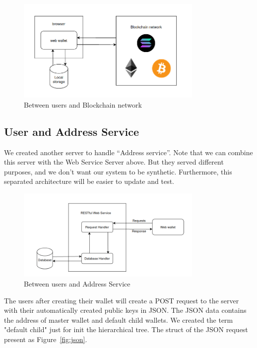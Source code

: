 \begin{figure}[ht!]
    \centering
    \includegraphics[width=0.8\textwidth]{images/design_ubl.png}
    \caption[Between users and Blockchain network]{Between users and Blockchain network}
    \label{fig:ubl}
\end{figure}

\subsection{User and Address Service}

We created another server to handle “Address service”. Note that we can combine this server with the Web Service Server above. But they served different purposes, and we don’t want our system to be synthetic. Furthermore, this separated architecture will be easier to update and test.

\begin{figure}[ht!]
    \centering
    \includegraphics[width=0.8\textwidth]{images/design_uas.png}
    \caption[Between users and Address Service]{Between users and Address Service}
    \label{fig:uas}
\end{figure}

The users after creating their wallet will create a POST request to the server with their automatically created public keys in JSON.
The JSON data contains the address of master wallet and default child wallets.
We created the term "default child" just for init the hierarchical tree.
The struct of the JSON request present as Figure~\ref{fig:json}.

